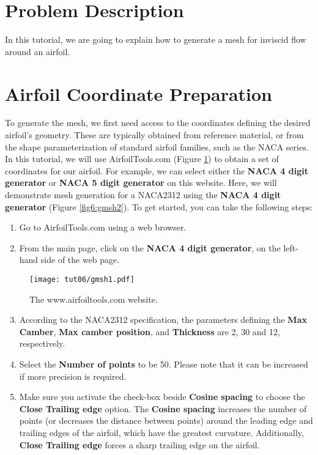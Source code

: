 \section*{Problem Description}
In this tutorial, we are going to explain how to generate a mesh for inviscid flow around an airfoil.
\section*{Airfoil Coordinate Preparation}
To generate the mesh, we first need access to the coordinates defining the desired airfoil's geometry. These are typically obtained from reference material, or from the shape parameterization of standard airfoil families, such as the NACA series. In this tutorial, we will use AirfoilTools.com (Figure \ref{fig6:gmsh1}) to obtain a set of coordinates for our airfoil. For example, we can select either the \textbf{NACA 4 digit generator} or \textbf{NACA 5 digit generator} on this website. Here, we will demonstrate mesh generation for a NACA2312 using the \textbf{NACA 4 digit generator} (Figure \ref{fig6:gmsh2}).
To get started, you can take the following steps:
\begin{enumerate}[label=\arabic*)]
	\setcounter{enumi}{0}
	\item Go to AirfoilTools.com using a web browser.
	\item From the main page, click on the \textbf{NACA 4 digit generator}, on the left-hand side of the web page.
\end{enumerate}
\begin{figure}[H]
	\centering
	\texttt{[image: tut06/gmsh1.pdf]}
	\caption{The www.airfoiltools.com website.}
	\label{fig6:gmsh1}
\end{figure}
\begin{enumerate}[label=\arabic*)]
	\setcounter{enumi}{2}
	\item According to the NACA2312 specification, the parameters defining the \textbf{Max Camber}, \textbf{Max camber position}, and \textbf{Thickness} are 2, 30 and 12, respectively.
	\item Select the \textbf{Number of points} to be 50. Please note that it can be increased if more precision is required.
	\item Make sure you activate the check-box beside \textbf{Cosine spacing} to choose the \textbf{Close Trailing edge} option. The \textbf{Cosine spacing} increases the number of points (or decreases the distance between points) around the leading edge and trailing edges of the airfoil, which have the greatest curvature. Additionally, \textbf{Close Trailing edge} forces a sharp trailing edge on the airfoil.
\end{enumerate}
